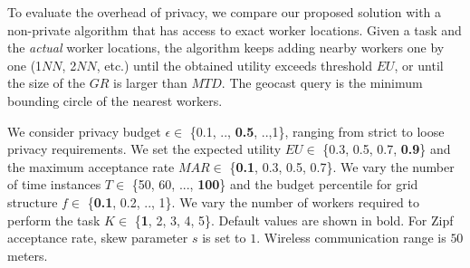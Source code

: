 \documentclass{USC-Thesis}
\renewcommand\bf\bfseries
\numberwithin{equation}{chapter}
\begin{document}
\begin{comment}
\begin{figure*}[ht]
	\begin{minipage}[b]{0.33\linewidth}
	\centering
		\texttt{[image: exps/gowalla\_sf\_workers]}
		\subcaption{Gowalla, San Francisco}
		\label{fig:gowalla_sf}	
	\end{minipage}
	\begin{minipage}[b]{0.33\linewidth}
	\centering
		\texttt{[image: exps/yelp\_workers]}
		\subcaption{Yelp, Greater Phoenix}
		\label{fig:yelp}	
	\end{minipage}
	\begin{minipage}[b]{0.33\linewidth}
	\centering
		\texttt{[image: exps/foursquare\_workers]}
		\subcaption{Foursquare, Pittsburgh}
		\label{fig:foursquare}	
	\end{minipage}
\caption{Worker distributions in real-world datasets (one time snapshot)}
\label{fig:data_distribution}
\end{figure*}
\end{comment}

To evaluate the overhead of privacy, we compare our proposed solution with a non-private algorithm that has access to exact worker locations. Given a task and the {\em actual} worker locations, the algorithm keeps adding nearby workers one by one (1$\mathit{NN}$, 2$\mathit{NN}$, etc.) until the obtained utility exceeds threshold $\mathit{EU}$, or until the size of the $GR$ is larger than $\mathit{MTD}$. The geocast query is the minimum bounding circle of the nearest workers.

We consider privacy budget $\epsilon \in$ \{0.1, .., {\bf 0.5}, ..,1\}, ranging from strict to loose privacy requirements. We set the expected utility $\mathit{EU} \in$ \{0.3, 0.5, 0.7, {\bf 0.9}\} and the maximum acceptance rate $\mathit{MAR}\in$ \{{\bf 0.1}, 0.3, 0.5, 0.7\}. We vary the number of time instances $T\in$ \{50, 60, ..., {\bf 100}\} and the budget percentile for grid structure $f\in$ \{{\bf 0.1}, 0.2, .., 1\}. We vary the number of workers required to perform the task $K\in$ \{{\bf 1}, 2, 3, 4, 5\}. Default values are shown in bold. For Zipf acceptance rate, skew parameter $s$ is set to $1$. Wireless communication range is $50$ meters.
\end{document}
